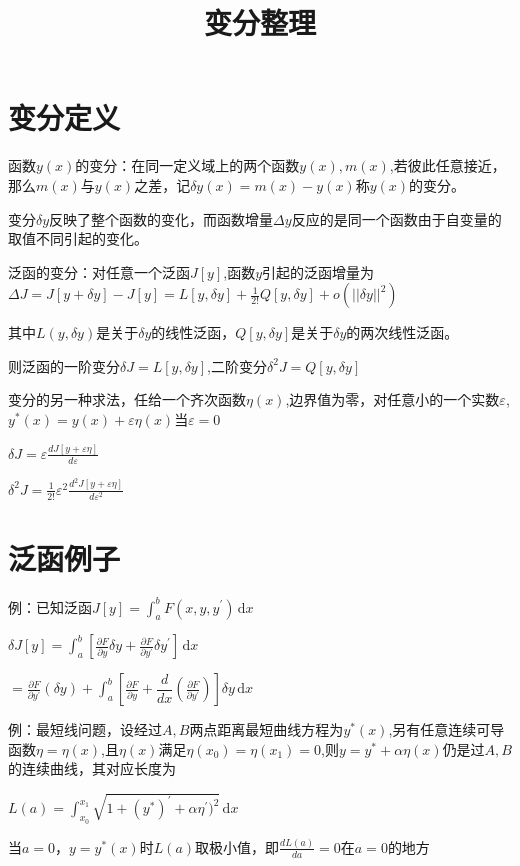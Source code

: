 \documentclass{article}
\begin{document}
\title{变分整理}
\maketitle
\section{变分定义}
函数$y(x)$的变分：在同一定义域上的两个函数$y(x),m(x)$,若彼此任意接近，那么$m(x)$与$y(x)$之差，记$\delta y(x)=m(x)-y(x)$称$y(x)$的变分。

变分$\delta y$反映了整个函数的变化，而函数增量$ \Delta y $反应的是同一个函数由于自变量的取值不同引起的变化。

泛函的变分：对任意一个泛函$J[y]$,函数$y$引起的泛函增量为$\Delta J=J[y+\delta y]-J[y]=L[y,\delta y]+\frac{1}{2!}Q[y,\delta y]+o(||\delta y||^2)$

其中$L(y,\delta y)$是关于$\delta y$的线性泛函，$Q[y,\delta y]$是关于$\delta y$的两次线性泛函。

则泛函的一阶变分$\delta J=L[y,\delta y]$,二阶变分$\delta^2J=Q[y,\delta y]$

变分的另一种求法，任给一个齐次函数$\eta(x)$,边界值为零，对任意小的一个实数$\varepsilon$,$y^{*}(x)=y(x)+\varepsilon\eta(x)$当$\varepsilon=0$

$\delta J=\varepsilon\frac{dJ[y+\varepsilon\eta]}{d\varepsilon}$

$\delta^2 J=\frac{1}{2!}\varepsilon^2\frac{d^2J[y+\varepsilon\eta]}{d\varepsilon^2}$

\section{泛函例子}
例：已知泛函$J[y]=\int_{a}^{b}F(x,y,y^{'})\,\mathrm{d}x$

$ \delta J[y]=\int_{a}^{b}[\frac{\partial F}{\partial y}\delta y+\frac{\partial F}{\partial y^{'}}\delta y^{'}]\,\mathrm{d}x $

$=\frac{\partial F}{\partial y^{'}}(\delta y)+\int_{a}^{b}[\frac{\partial F}{\partial y}+\dfrac{d}{dx}(\frac{\partial F}{\partial y^{'}})]\delta y\,\mathrm{d}x $

例：最短线问题，设经过$A,B$两点距离最短曲线方程为$y^{*}(x)$,另有任意连续可导函数$\eta=\eta(x)$,且$\eta(x)$满足$\eta(x_{0})=\eta(x_{1})=0$,则$y=y^{*}+\alpha\eta(x)$仍是过$A,B$的连续曲线，其对应长度为

$L(a)=\int_{x_{0}}^{x_{1}}\sqrt{1+(y^{*})^{'}+\alpha\eta^{'})^2}\,\mathrm{d}x$

当$a=0$，$y=y^{*}(x)$时$L(a)$取极小值，即$\frac{dL(a)}{da}=0$在$a=0$的地方
\end{document}
